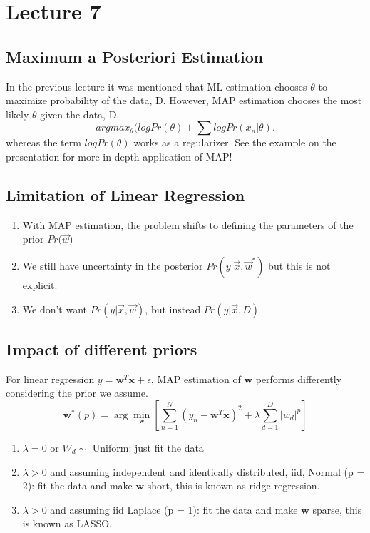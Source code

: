 \documentclass[12pt]{article}
\numberwithin{equation}{section}
\begin{document}
\section{Lecture 7}
\subsection{Maximum a Posteriori Estimation}
In the previous lecture it was mentioned that ML estimation chooses $\theta$ to maximize probability of the data, D. However, MAP estimation chooses the most likely $\theta$ given the data, D.
\begin{equation}
arg max_\theta (log Pr(\theta)+\sum log Pr(x_n |\theta). 
\end{equation}
whereas the term $log Pr(\theta)$ works as a regularizer. See the example on the presentation for more in depth application of MAP!
\subsection{Limitation of Linear Regression}
\begin{enumerate}
\item With MAP estimation, the problem shifts to defining the parameters of the prior $Pr(\vec{w}$)
\item We still have uncertainty in the posterior $Pr(y|\vec{x},\vec{w}^*)$ but this is not explicit.
\item We don’t want $Pr(y|\vec{x},\vec{w})$, but instead $P r(y|\vec{x},D)$
\end{enumerate}

\subsection{Impact of different priors}
For linear regression $y = \bm{w}^T \bm{x} + \epsilon$, MAP estimation of $\bm{w}$ performs differently considering the prior we assume.
\begin{equation}
    \bm{w}^*(p) =  \arg \min_{\bm{w}} [\sum_{n=1}^N(y_n - \bm{w}^T \bm{x})^2 + \lambda \sum_{d = 1}^D |w_d|^p]
\end{equation}

\begin{enumerate}
    \item $\lambda = 0$ or $W_d\sim$ Uniform: just fit the data
    \item $\lambda > 0$ and assuming independent and identically distributed, iid, Normal (p = 2): fit the data and make $\bm{w}$ short, this is known as ridge regression.
    \item $\lambda > 0$ and assuming iid Laplace (p = 1): fit the data and make $\bm{w}$ sparse, this is known as LASSO.
\end{enumerate}
\end{document}
